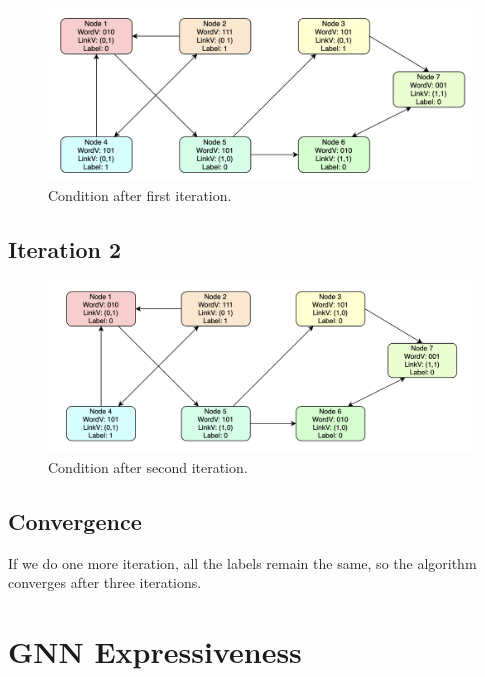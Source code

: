 \documentclass[a4paper,11pt]{article}
\begin{document}
\begin{figure}[ht!]
    \centering
    \includegraphics[width=130mm]{Figures/3_2.png}
    \caption{Condition after first iteration.}
\end{figure}

\subsection{Iteration 2}

\begin{figure}[ht!]
    \centering
    \includegraphics[width=130mm]{Figures/3_3.png}
    \caption{Condition after second iteration.}
\end{figure}

\subsection{Convergence}

If we do one more iteration, all the labels remain the same, so the algorithm converges after three iterations.


\newpage
\section{GNN Expressiveness}
\end{document}

